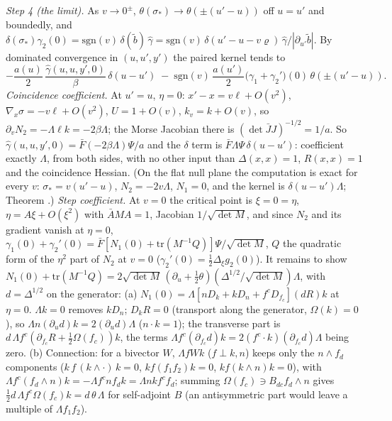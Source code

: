 \emph{Step 4 (the limit).} As $v \to 0^{\pm}$, $\theta(\sigma_{*}) \to \theta(\pm(u' - u))$ off $u = u'$ and boundedly, and $\delta(\sigma_{*})\gamma_{2}(0) = \mathrm{sgn}(v)\,\delta(\tilde b)\,\hat\gamma = \mathrm{sgn}(v)\,\delta(u' - u - v\varrho)\,\hat\gamma/|\partial_{u'}\tilde b|$. By dominated convergence in $(u, u', y')$ the paired kernel tends to
\[
-\frac{a(u)}{2}\,\frac{\hat\gamma(u, u, y', 0)}{\beta}\,\delta(u - u') \;-\; \mathrm{sgn}(v)\,\frac{a(u')}{2}\bigl(\gamma_{1} + \gamma_{2}'\bigr)(0)\,\theta(\pm(u' - u)).
\]
\emph{Coincidence coefficient.} At $u' = u$, $\eta = 0$: $x' - x = v\ell + O(v^{2})$, $\nabla_{x}\sigma = -v\ell + O(v^{2})$, $U = 1 + O(v)$, $k_{v} = k + O(v)$, so $\partial_{v}N_{2} = -\Lambda\ell k = -2\beta\Lambda$; the Morse Jacobian there is $(\det\bar JJ)^{-1/2} = 1/a$. So $\hat\gamma(u, u, y', 0) = \bar F(-2\beta\Lambda)\Psi/a$ and the $\delta$ term is $\bar F\Lambda\Psi\,\delta(u - u')$: coefficient exactly $\Lambda$, from both sides, with no other input than $\Delta(x, x) = 1$, $R(x, x) = 1$ and the coincidence Hessian. (On the flat null plane the computation is exact for every $v$: $\sigma_{*} = v(u' - u)$, $N_{2} = -2v\Lambda$, $N_{1} = 0$, and the kernel is $\delta(u - u')\Lambda$; Theorem .)
\emph{Step coefficient.} At $v = 0$ the critical point is $\xi = 0 = \eta$, $\eta = A\xi + O(\xi^{2})$ with $\bar AMA = 1$, Jacobian $1/\sqrt{\det M}$, and since $N_{2}$ and its gradient vanish at $\eta = 0$, $\gamma_{1}(0) + \gamma_{2}'(0) = \bar F[N_{1}(0) + \mathrm{tr}(M^{-1}Q)]\Psi/\sqrt{\det M}$, $Q$ the quadratic form of the $\eta^{2}$ part of $N_{2}$ at $v = 0$ ($\gamma_{2}'(0) = \tfrac12\Delta_{\xi}g_{2}(0)$). It remains to show $N_{1}(0) + \mathrm{tr}(M^{-1}Q) = 2\sqrt{\det M}\,(\partial_{u} + \tfrac12\theta)(\Delta^{1/2}/\sqrt{\det M})\Lambda$, with $d = \Delta^{1/2}$ on the generator:
(a) $N_{1}(0) = \Lambda[nD_{k} + kD_{n} + f^{c}D_{f_{c}}](dR)k$ at $\eta = 0$. $\Lambda k = 0$ removes $kD_{n}$; $D_{k}R = 0$ (transport along the generator, $\Omega(k) = 0$), so $\Lambda n(\partial_{u}d)k = 2(\partial_{u}d)\Lambda$ ($n\cdot k = 1$); the transverse part is $d\,\Lambda f^{c}(\partial_{f_{c}}R + \tfrac12\Omega(f_{c}))k$, the terms $\Lambda f^{c}(\partial_{f_{c}}d)k = 2(f^{c}\cdot k)(\partial_{f_{c}}d)\Lambda$ being zero.
(b) Connection: for a bivector $W$, $\Lambda fWk$ ($f \perp k, n$) keeps only the $n\wedge f_{d}$ components ($k\,f\,(k\wedge\cdot)\,k = 0$, $kf(f_{1}f_{2})k = 0$, $kf(k\wedge n)k = 0$), with $\Lambda f^{c}(f_{d}\wedge n)k = -\Lambda f^{c}nf_{d}k = \Lambda nkf^{c}f_{d}$; summing $\Omega(f_{c}) \ni B_{dc}f_{d}\wedge n$ gives $\tfrac12 d\,\Lambda f^{c}\Omega(f_{c})k = d\,\theta\,\Lambda$ for self-adjoint $B$ (an antisymmetric part would leave a multiple of $\Lambda f_{1}f_{2}$).
